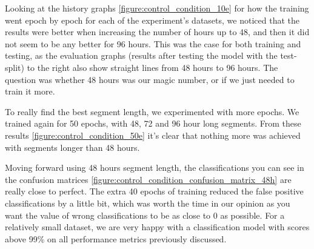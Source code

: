 Looking at the history graphs \ref{figure:control_condition_10e} for how the training went epoch by epoch for each of the experiment's datasets, 
we noticed that the results were better when increasing the number of hours up to 48, and then it did not seem to be any better for 96 hours. 
This was the case for both training and testing, as the evaluation graphs (results after testing the model with the test-split) to the right also show straight lines from 
48 hours to 96 hours. The question was whether 48 hours was our magic number, or if we just needed to train it more.

To really find the best segment length, we experimented with more epochs. We trained again for 50 epochs, with 48, 72 and 96 hour long segments. 
From these results \ref{figure:control_condition_50e} it's clear that nothing more was achieved with segments longer than 48 hours. 

Moving forward using 48 hours segment length, the classifications you can see in the confusion matrices \ref{figure:control_condition_confusion_matrix_48h} 
are really close to perfect. The extra 40 epochs of training reduced the false positive classifications by a little bit, which was worth the time in our opinion as 
you want the value of wrong classifications to be as close to 0 as possible. For a relatively small dataset, we are very happy with a classification model 
with scores above 99\% on all performance metrics previously discussed. 

